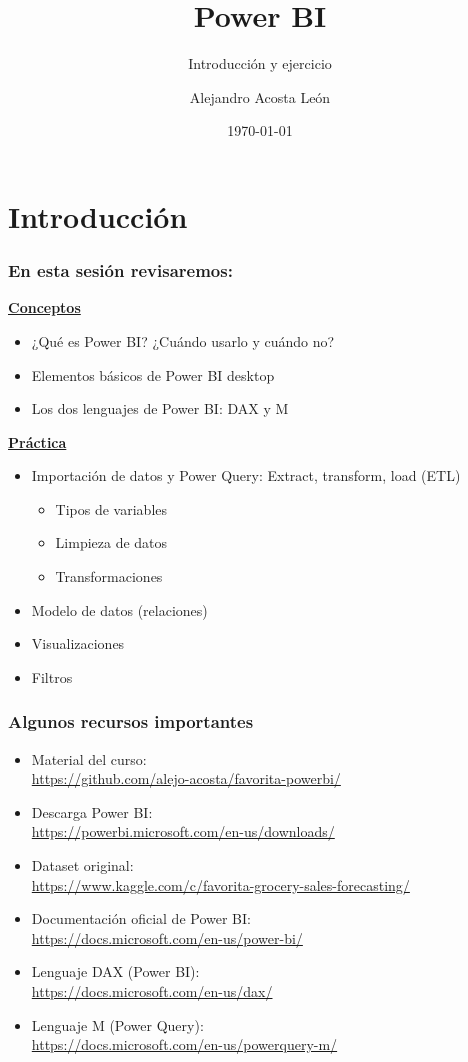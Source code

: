 \documentclass{beamer}
\title{Power BI}
\subtitle{Introducción y ejercicio}
\author{Alejandro Acosta León}
\date{\today}
\begin{document}
\maketitle

\section{Introducción}
\begin{frame}
	\frametitle{En esta sesión revisaremos:}
	\underline{\textbf{Conceptos}}
		\begin{itemize}
			\item ¿Qué es Power BI? ¿Cuándo usarlo y cuándo no?
			\item Elementos básicos de Power BI desktop
			\item Los dos lenguajes de Power BI: DAX y M
		\end{itemize}
		\underline{\textbf{Práctica}}
		\begin{itemize}
			\item Importación de datos y Power Query: Extract, transform, load (ETL)
			\begin{itemize}
				\item Tipos de variables
				\item Limpieza de datos
				\item Transformaciones
			\end{itemize}
			\item Modelo de datos (relaciones)
			\item Visualizaciones
			\item Filtros
		\end{itemize}
\end{frame}

\begin{frame}
	\frametitle{Algunos recursos importantes}
		\begin{itemize}
			\item Material del curso: \\
			\small{\url{https://github.com/alejo-acosta/favorita-powerbi/}}
			\item Descarga Power BI: \\
			\small{\url{https://powerbi.microsoft.com/en-us/downloads/}}
			\item Dataset original: \\
			\small{\url{https://www.kaggle.com/c/favorita-grocery-sales-forecasting/}}
			\item Documentación oficial de Power BI: \\
			\small{\url{https://docs.microsoft.com/en-us/power-bi/}}
			\item Lenguaje DAX (Power BI): \\
			\small{\url{https://docs.microsoft.com/en-us/dax/}}
			\item Lenguaje M (Power Query): \\
			\small{\url{https://docs.microsoft.com/en-us/powerquery-m/}}
		\end{itemize}
\end{frame}
\end{document}
